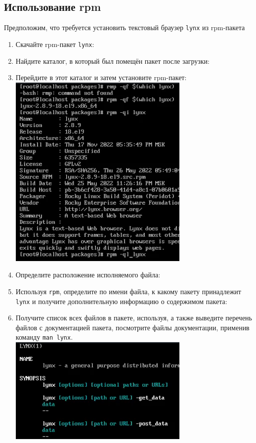 \documentclass[12pt]{article}
\begin{document}
\subsection{Использование rpm}
Предположим, что требуется установить текстовый браузер \texttt{lynx} из rpm-пакета
\begin{enumerate}
	\item Скачайте rpm-пакет \texttt{lynx}:
	\item Найдите каталог, в который был помещён пакет после загрузки:
	\item Перейдите в этот каталог и затем установите rpm-пакет:
	      \\\includegraphics{8.png}
	\item Определите расположение исполняемого файла:
	\item Используя \texttt{rpm}, определите по имени файла, к какому пакету принадлежит \texttt{lynx} и получите дополнительную информацию о содержимом пакета:
	\item Получите список всех файлов в пакете, используя, а также выведите перечень файлов с документацией пакета, посмотрите файлы документации, применив команду \texttt{man lynx}.
	      \\\includegraphics{9.png}

\end{enumerate}
\end{document}
